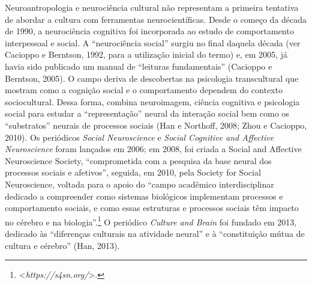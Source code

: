 Neuroantropologia e neurociência cultural não representam a primeira
tentativa de abordar a cultura com ferramentas neurocientíficas. Desde o
começo da década de 1990, a neurociência cognitiva foi incorporada ao
estudo de comportamento interpessoal e social. A ``neurociência social''
surgiu no final daquela década (ver Cacioppo e Berntson, 1992, para a
utilização inicial do termo) e, em 2005, já havia sido publicado um
manual de ``leituras fundamentais'' (Cacioppo e Berntson, 2005). O campo
deriva de descobertas na psicologia transcultural que mostram como a
cognição social e o comportamento dependem do contexto sociocultural.
Dessa forma, combina neuroimagem, ciência cognitiva e psicologia social
para estudar a ``representação'' neural da interação social bem como os
``substratos'' neurais de processos sociais (Han e Northoff, 2008; Zhou
e Cacioppo, 2010). Os periódicos \emph{Social Neuroscience} e
\emph{Social Cognitive and Affective Neuroscience} foram lançados em
2006; em 2008, foi criada a Social and Affective Neuroscience Society,
``comprometida com a pesquisa da base neural dos processos sociais e
afetivos'', seguida, em 2010, pela Society for Social Neuroscience,
voltada para o apoio do ``campo acadêmico interdisciplinar dedicado a
compreender como sistemas biológicos implementam processos e
comportamento sociais, e como essas estruturas e processos sociais têm
impacto no cérebro e na biologia''.\footnote[11]{\textless{}\emph{https://s4sn.org/}\textgreater{}.} O periódico
\emph{Culture and Brain} foi fundado em 2013, dedicado às ``diferenças
culturais na atividade neural'' e à ``constituição mútua de cultura e
cérebro'' (Han, 2013).

